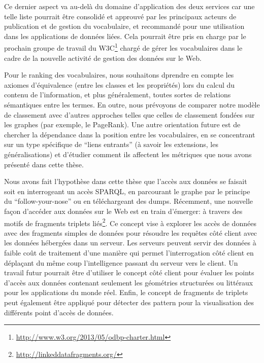 Ce dernier aspect va au-del\`{a} du domaine d'application des deux services car une telle liste pourrait \^{e}tre consolid\'{e} et approuv\'{e} par les principaux acteurs de publication et de gestion du vocabulaire, et recommand\'{e} pour une utilisation dans les applications de donn\'{e}es li\'{e}es. Cela pourrait \^{e}tre pris en charge par le prochain groupe de travail du W3C\footnote{\url{http://www.w3.org/2013/05/odbp-charter.html}} charg\'{e} de g\'{e}rer les vocabulaires dans le cadre de la nouvelle activit\'{e} de gestion des donn\'{e}es sur le Web.

Pour le ranking des vocabulaires, nous souhaitons dprendre en compte les axiomes d'\'{e}quivalence (entre les classes et les propri\'{e}t\'{e}s) lors du calcul du contenu de l'information, et plus g\'{e}n\'{e}ralement, toutes sortes de relations s\'{e}mantiques entre les termes. En outre, nous pr\'{e}voyons de comparer notre mod\`{e}le de classement avec d'autres approches telles que celles de classement fond\'{e}es sur les graphes  (par exemple, le PageRank). Une autre orientation future est de chercher la d\'{e}pendance dans la position entre les vocabulaires, en se concentrant sur un type sp\'{e}cifique de ``liens entrants'' (\`{a} savoir les extensions, les g\'{e}n\'{e}ralisations) et d'\'{e}tudier comment ils affectent les m\'{e}triques que nous avons pr\'{e}sent\'{e} dans cette th\`{e}se.

Nous avons fait l'hypoth\`{e}se dans cette th\`{e}se que l'acc\`{e}s aux donn\'{e}es se faisait soit en interrogeant un acc\`{e}s SPARQL, en parcourant le graphe par le principe du ``follow-your-nose'' ou en t\'{e}l\'{e}chargeant des dumps. R\'{e}cemment, une nouvelle fa\c{c}on d'acc\'{e}der aux donn\'{e}es sur le Web est en train d'\'{e}merger: \`{a} travers  des motifs de fragments triplets li\'{e}s\footnote{\url{http://linkeddatafragments.org/}}. Ce concept vise \`{a} explorer les acc\`{e}s de donn\'{e}es avec des fragments simples de donn\'{e}es pour r\'{e}soudre les requ\^{e}tes côt\'{e} client avec les donn\'{e}es h\'{e}berg\'{e}es dans un serveur. Les serveurs peuvent servir des donn\'{e}es \`{a} faible co\^{u}t de traitement d'une mani\`{e}re qui permet l'interrogation côt\'{e} client en d\'{e}pla\c{c}ant du m\^{e}me coup l'intelligence passant du serveur vers le client. Un travail futur pourrait \^{e}tre d'utiliser le concept côt\'{e} client pour \'{e}valuer les points d'acc\`{e}s aux donn\'{e}es contenant seulement les g\'{e}om\'{e}tries structur\'{e}es ou litt\'{e}raux pour les applications du monde r\'{e}el. Enfin, le concept de fragments de triplets  peut \'{e}galement \^{e}tre appliqu\'{e} pour d\'{e}tecter des pattern pour la visualisation des diff\'{e}rents point d'acc\`{e}s de donn\'{e}es.

